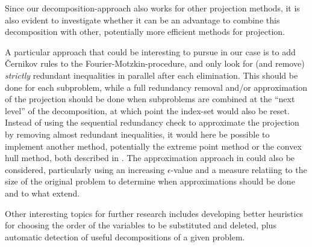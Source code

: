 Since our decomposition-approach also works for other projection methods, it is also evident to investigate whether it can be an advantage to combine this decomposition with other, potentially more efficient methods for projection.

A particular approach that could be interesting to pursue in our case is to add \v{C}ernikov rules to the Fourier-Motzkin-procedure, and only look for (and remove) \emph{strictly} redundant inequalities in parallel after each elimination. This should be done for each subproblem, while a full redundancy removal and/or approximation of the projection should be done when subproblems are combined at the ``next level'' of the decomposition, at which point the index-set would also be reset. Instead of using the sequential redundancy check to approximate the projection by removing almost redundant inequalities, it would here be possible to implement another method, potentially the extreme point method or the convex hull method, both described in \cite{huynh92}. The approximation approach in \cite{shapot12} could also be considered, particularly using an increasing $\epsilon$-value and a measure relatiing to the size of the original problem to determine when approximations should be done and to what extend.   

Other interesting topics for further research includes developing better heuristics for choosing the order of the variables to be substituted and deleted, plus automatic detection of useful decompositions of a given problem.